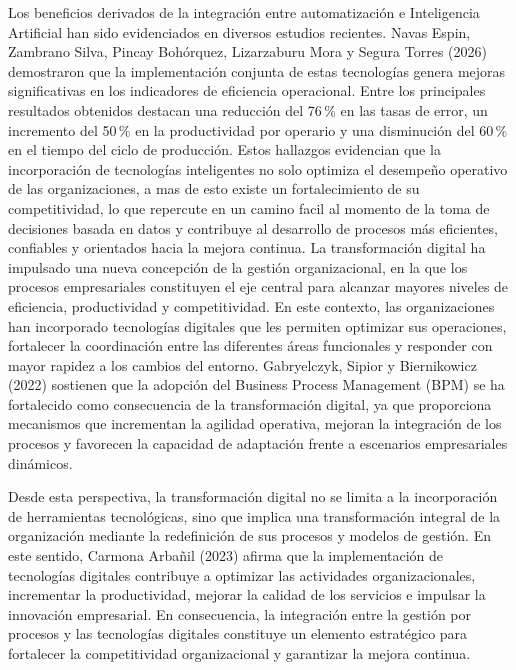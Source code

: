Los beneficios derivados de la integración entre automatización e Inteligencia Artificial han sido evidenciados en diversos estudios recientes. Navas Espin, Zambrano Silva, Pincay Bohórquez, Lizarzaburu Mora y Segura Torres (2026) demostraron que la implementación conjunta de estas tecnologías genera mejoras significativas en los indicadores de eficiencia operacional. Entre los principales resultados obtenidos destacan una reducción del 76\,\% en las tasas de error, un incremento del 50\,\% en la productividad por operario y una disminución del 60\,\% en el tiempo del ciclo de producción. Estos hallazgos evidencian que la incorporación de tecnologías inteligentes no solo optimiza el desempeño operativo de las organizaciones, a mas de esto existe un fortalecimiento de su competitividad, lo que repercute en un camino facil al momento de la toma de decisiones basada en datos y contribuye al desarrollo de procesos más eficientes, confiables y orientados hacia la mejora continua.
La transformación digital ha impulsado una nueva concepción de la gestión organizacional, en la que los procesos empresariales constituyen el eje central para alcanzar mayores niveles de eficiencia, productividad y competitividad. En este contexto, las organizaciones han incorporado tecnologías digitales que les permiten optimizar sus operaciones, fortalecer la coordinación entre las diferentes áreas funcionales y responder con mayor rapidez a los cambios del entorno. Gabryelczyk, Sipior y Biernikowicz (2022) sostienen que la adopción del Business Process Management (BPM) se ha fortalecido como consecuencia de la transformación digital, ya que proporciona mecanismos que incrementan la agilidad operativa, mejoran la integración de los procesos y favorecen la capacidad de adaptación frente a escenarios empresariales dinámicos.

Desde esta perspectiva, la transformación digital no se limita a la incorporación de herramientas tecnológicas, sino que implica una transformación integral de la organización mediante la redefinición de sus procesos y modelos de gestión. En este sentido, Carmona Arbañil (2023) afirma que la implementación de tecnologías digitales contribuye a optimizar las actividades organizacionales, incrementar la productividad, mejorar la calidad de los servicios e impulsar la innovación empresarial. En consecuencia, la integración entre la gestión por procesos y las tecnologías digitales constituye un elemento estratégico para fortalecer la competitividad organizacional y garantizar la mejora continua.

